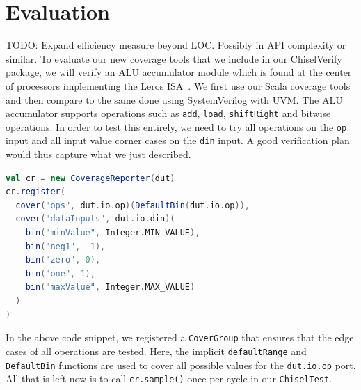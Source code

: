 \documentclass[conference]{IEEEtran}
\newcommand{\todo}[1]{{\color{olive} TODO: #1}}
\newcommand{\martin}[1]{{\color{blue} Martin: #1}}
\newcommand{\hjd}[1]{{\color{pink} Hans: #1}}
\begin{document}
\section{Evaluation}
\todo{Expand efficiency measure beyond LOC. Possibly in API complexity or similar.}
To evaluate our new coverage tools that we include in our ChiselVerify package, we will verify an ALU accumulator module which is found at the center of processors implementing the Leros ISA~\cite{leros:comp:2019}. We first use our Scala coverage tools and then compare to the same done using SystemVerilog with UVM. %
The ALU accumulator supports operations such as \texttt{add}, \texttt{load}, \texttt{shiftRight} and bitwise operations. %
In order to test this entirely, we need to try all operations on the \texttt{op} input and all input value corner cases on the \texttt{din} input. %
A good verification plan would thus capture what we just described.  
\begin{lstlisting}[language=scala] 
val cr = new CoverageReporter(dut)  
cr.register(
  cover("ops", dut.io.op)(DefaultBin(dut.io.op)),
  cover("dataInputs", dut.io.din)(
    bin("minValue", Integer.MIN_VALUE),
    bin("neg1", -1),
    bin("zero", 0),
    bin("one", 1),
    bin("maxValue", Integer.MAX_VALUE)
  )
)
\end{lstlisting}
In the above code snippet, we registered a \texttt{CoverGroup} that ensures that the edge cases of all operations are tested.
Here, the implicit \texttt{defaultRange} and \texttt{DefaultBin} functions are used to cover all possible values for the \texttt{dut.io.op} port.
All that is left now is to call \texttt{cr.sample()} once per cycle in our \texttt{ChiselTest}.
\end{document}
